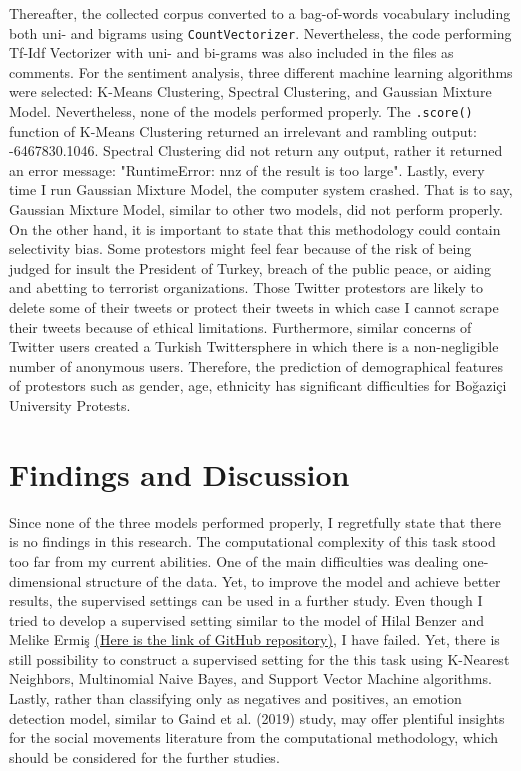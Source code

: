 \documentclass[a4paper]{article}
\begin{document}
Thereafter, the collected corpus converted to a bag-of-words vocabulary including both uni- and bigrams using \verb|CountVectorizer|. Nevertheless, the code performing Tf-Idf Vectorizer with uni- and bi-grams was also included in the files as comments. For the sentiment analysis, three different machine learning algorithms were selected: K-Means Clustering, Spectral Clustering, and Gaussian Mixture Model. Nevertheless, none of the models performed properly. The \verb|.score()| function of K-Means Clustering returned an irrelevant and rambling output: -6467830.1046. Spectral Clustering did not return any output, rather it returned an error message: "RuntimeError: nnz of the result is too large". Lastly, every time I run Gaussian Mixture Model, the computer system crashed. That is to say, Gaussian Mixture Model, similar to other two models, did not perform properly. \\

On the other hand, it is important to state that this methodology could contain selectivity bias. Some protestors might feel fear because of the risk of being judged for insult the President of Turkey, breach of the public peace, or aiding and abetting to terrorist organizations. Those Twitter protestors are likely to delete some of their tweets or protect their tweets in which case I cannot scrape their tweets because of ethical limitations. Furthermore, similar concerns of Twitter users created a Turkish Twittersphere in which there is a non-negligible number of anonymous users. Therefore, the prediction of demographical features of protestors such as gender, age, ethnicity has significant difficulties for Boğaziçi University Protests.
    
\section{Findings and Discussion}

Since none of the three models performed properly, I regretfully state that there is no findings in this research. The computational complexity of this task stood too far from my current abilities. One of the main difficulties was dealing one-dimensional structure of the data. Yet, to improve the model and achieve better results, the supervised settings can be used in a further study. Even though I tried to develop a supervised setting similar to the model of Hilal Benzer and Melike Ermiş \href{https://github.com/hilalbenzer/turkish-sentiment-analysis}{(Here is the link of GitHub repository)}, I have failed. Yet, there is still possibility to construct a supervised setting for the this task using K-Nearest Neighbors, Multinomial Naive Bayes, and Support Vector Machine algorithms. Lastly, rather than classifying only as negatives and positives, an emotion detection model, similar to Gaind et al. (2019) study, may offer plentiful insights for the social movements literature from the computational methodology, which should be considered for the further studies.
    
\end{document}
